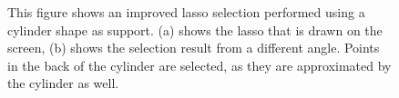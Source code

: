 \begin{figure}
\centering
{}
\caption[Example of an improved lasso selection on a cylinder]
{This figure shows an improved lasso selection performed using a cylinder shape as support. (a) shows the lasso that is drawn on the screen, (b) shows the selection result from a different angle. Points in the back of the cylinder are selected, as they are approximated by the cylinder as well. }
\label{fig:synthetic_scene_lasso}
\end{figure}


